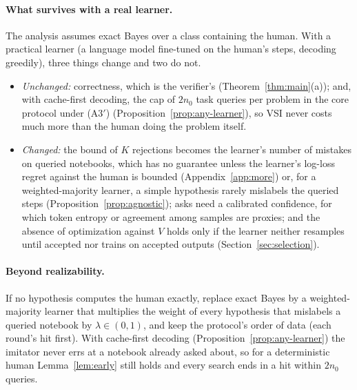 \documentclass[11pt]{article}
\theoremstyle{definition}
\theoremstyle{remark}
\newcommand{\K}{K}
\begin{document}
\paragraph{What survives with a real learner.} The analysis assumes exact Bayes over a class containing the human. With a practical learner (a language model fine-tuned on the human's steps, decoding greedily), three things change and two do not.
\begin{itemize}[nosep]
\item \emph{Unchanged:} correctness, which is the verifier's (Theorem~\ref{thm:main}(a)); and, with cache-first decoding, the cap of $2n_0$ task queries per problem in the core protocol under (A3$'$) (Proposition~\ref{prop:any-learner}), so VSI never costs much more than the human doing the problem itself.
\item \emph{Changed:} the bound of $\K$ rejections becomes the learner's number of mistakes on queried notebooks, which has no guarantee unless the learner's log-loss regret against the human is bounded (Appendix~\ref{app:more}) or, for a weighted-majority learner, a simple hypothesis rarely mislabels the queried steps (Proposition~\ref{prop:agnostic}); asks need a calibrated confidence, for which token entropy or agreement among samples are proxies; and the absence of optimization against $V$ holds only if the learner neither resamples until accepted nor trains on accepted outputs (Section~\ref{sec:selection}).
\end{itemize}

\paragraph{Beyond realizability.} If no hypothesis computes the human exactly, replace exact Bayes by a weighted-majority learner that multiplies the weight of every hypothesis that mislabels a queried notebook by $\lambda\in(0,1)$, and keep the protocol's order of data (each round's hit first). With cache-first decoding (Proposition~\ref{prop:any-learner}) the imitator never errs at a notebook already asked about, so for a deterministic human Lemma~\ref{lem:early} still holds and every search ends in a hit within $2n_0$ queries.
\end{document}
